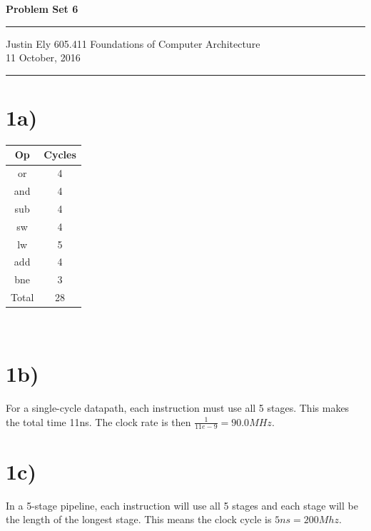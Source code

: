 \documentclass[a4paper,11pt]{article}
\begin{document}
\begin{flushright}

\vspace{1.1cm}

{\bf\Huge Problem Set 6}

\rule{0.25\linewidth}{0.5pt}

\vspace{0.5cm}
Justin Ely
\linebreak
\newline
\footnotesize{605.411 Foundations of Computer Architecture \\}
\vspace{0.5cm}
11 October, 2016
\end{flushright}

\noindent\rule{\linewidth}{1.0pt}


\section*{1a)}
\begin{tabular}{| c | c |}
  \hline	
  	Op & Cycles \\ \hline \hline
	or & 4 \\ \hline
	and & 4 \\ \hline
	sub & 4 \\ \hline
	sw & 4 \\ \hline
	lw & 5 \\ \hline
	add & 4 \\ \hline
	bne & 3 \\ \hline \hline
	Total & 28 \\ \hline
\end{tabular} \\

\section*{1b)}
For a single-cycle datapath, each instruction must use all 5 stages.  This makes the total time 11ns.  The clock rate is then
$\frac{1}{11e-9} = 90.0MHz$.

\section*{1c)}
In a 5-stage pipeline, each instruction will use all 5 stages and each stage will be the length of the longest stage.  This means the clock cycle is $5ns = 200Mhz$.
\end{document}
